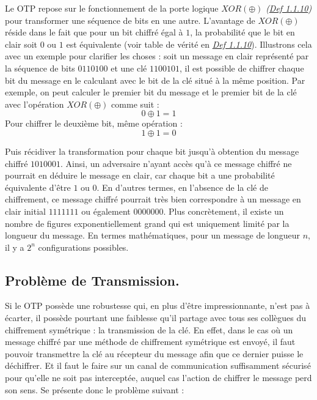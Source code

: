 \documentclass{article}
\begin{document}
Le OTP repose sur le fonctionnement
de la porte logique \(XOR (\oplus)\)
\textit{(\hyperref[def-1.1.10]{Def 1.1.10})} pour transformer une
séquence de bits en une autre. L'avantage de \(XOR (\oplus)\) réside
dans le fait que pour un bit chiffré égal à \(1\), la probabilité que le
bit en clair soit \(0\) ou \(1\) est équivalente (voir table de vérité
en \textit{\hyperref[def-1.1.10]{Def 1.1.10}}). Illustrons cela avec un
exemple pour clarifier les choses : soit un message en clair représenté
par la séquence de bits \(0110100\) et une clé \(1100101\), il est
possible de chiffrer chaque bit du message en le calculant avec le bit
de la clé situé à la même position. Par exemple, on peut calculer le
premier bit du message et le premier bit de la clé avec l'opération
\(XOR (\oplus)\) comme suit : \[
0 \oplus 1 = 1
\] Pour chiffrer le deuxième bit, même opération : \[
1 \oplus 1 = 0
\] 

Puis récidiver la transformation pour chaque bit jusqu'à obtention du
message chiffré \(1010001\). Ainsi, un adversaire n'ayant accès qu'à ce
message chiffré ne pourrait en déduire le message en clair, car chaque
bit a une probabilité équivalente d'être \(1\) ou \(0\). En d'autres
termes, en l'absence de la clé de chiffrement, ce message chiffré
pourrait très bien correspondre à un message en clair initial
\(1111111\) ou également \(0000000\). Plus concrètement, il existe un
nombre de figures exponentiellement grand qui est uniquement limité par
la longueur du message. En termes mathématiques, pour un message de
longueur \(n\), il y a \(2^n\) configurations possibles.

\newpage

\subsection{Problème de Transmission.}

Si le OTP possède une robustesse qui, en plus d'être impressionnante,
n'est pas à écarter, il possède pourtant une faiblesse qu'il partage
avec tous ses collègues du chiffrement symétrique : la transmission de
la clé. En effet, dans le cas où un message chiffré par une méthode de
chiffrement symétrique est envoyé, il faut pouvoir transmettre la clé au
récepteur du message afin que ce dernier puisse le déchiffrer. Et il
faut le faire sur un canal de communication suffisamment sécurisé pour
qu'elle ne soit pas interceptée, auquel cas l'action de chiffrer le
message perd son sens. Se présente donc le problème suivant :
\end{document}
